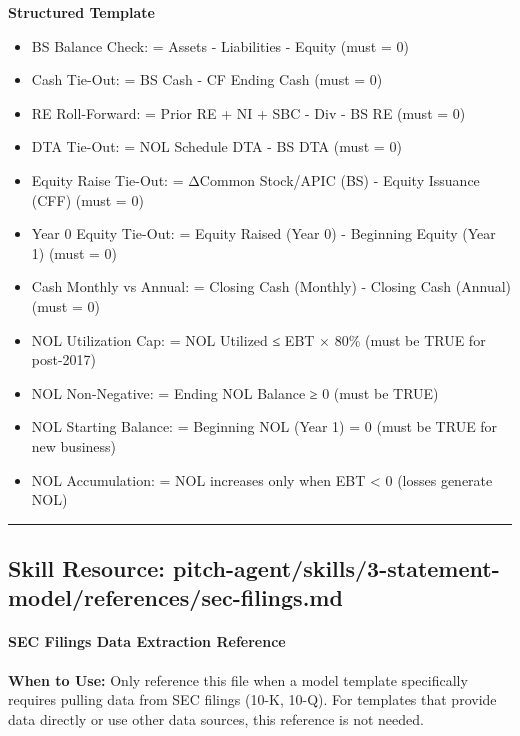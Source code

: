 \documentclass[11pt]{article}
\begin{document}
\textbf{Structured Template}
\begin{itemize}[leftmargin=*,itemsep=2pt,topsep=2pt]
\item {} BS Balance Check: = Assets - Liabilities - Equity (must = 0)
\item {} Cash Tie-Out: = BS Cash - CF Ending Cash (must = 0)
\item {} RE Roll-Forward: = Prior RE + NI + SBC - Div - BS RE (must = 0)
\item {} DTA Tie-Out: = NOL Schedule DTA - BS DTA (must = 0)
\item {} Equity Raise Tie-Out: = ΔCommon Stock/APIC (BS) - Equity Issuance (CFF) (must = 0)
\item {} Year 0 Equity Tie-Out: = Equity Raised (Year 0) - Beginning Equity (Year 1) (must = 0)
\item {} Cash Monthly vs Annual: = Closing Cash (Monthly) - Closing Cash (Annual) (must = 0)
\item {} NOL Utilization Cap: = NOL Utilized ≤ EBT × 80\% (must be TRUE for post-2017)
\item {} NOL Non-Negative: = Ending NOL Balance ≥ 0 (must be TRUE)
\item {} NOL Starting Balance: = Beginning NOL (Year 1) = 0 (must be TRUE for new business)
\item {} NOL Accumulation: = NOL increases only when EBT < 0 (losses generate NOL)
\end{itemize}

\vspace{0.8em}\hrule\vspace{0.8em}

\subsection{Skill Resource: pitch-agent/skills/3-statement-model/references/sec-filings.md}\label{file:pitch-agent-skills-3-statement-model-references-sec-filings-md}

\paragraph{SEC Filings Data Extraction Reference}\mbox{}\par

\textbf{When to Use:} Only reference this file when a model template specifically requires pulling data from SEC filings (10-K, 10-Q). For templates that provide data directly or use other data sources, this reference is not needed.
\end{document}
